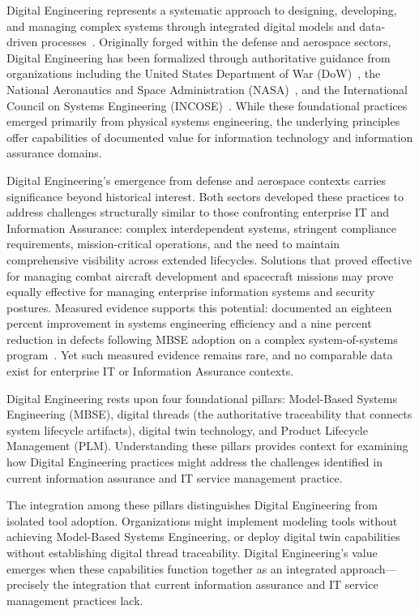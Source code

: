 Digital Engineering represents a systematic approach to designing, developing, and managing complex systems through integrated digital models and data-driven processes~\parencite{DigitalEngineeringInformationExchange}. Originally forged within the defense and aerospace sectors, Digital Engineering has been formalized through authoritative guidance from organizations including the United States Department of War (DoW)~\parencite{DoD_Engineering_2022}, the National Aeronautics and Space Administration (NASA)~\parencite{Engineer}, and the International Council on Systems Engineering (INCOSE)~\parencite{DigitalEngineeringInformationExchange}. While these foundational practices emerged primarily from physical systems engineering, the underlying principles offer capabilities of documented value for information technology and information assurance domains.

Digital Engineering's emergence from defense and aerospace contexts carries significance beyond historical interest. Both sectors developed these practices to address challenges structurally similar to those confronting enterprise IT and Information Assurance: complex interdependent systems, stringent compliance requirements, mission-critical operations, and the need to maintain comprehensive visibility across extended lifecycles. Solutions that proved effective for managing combat aircraft development and spacecraft missions may prove equally effective for managing enterprise information systems and security postures. Measured evidence supports this potential: \citeauthor{Rogers_Mitchell_2021} documented an eighteen percent improvement in systems engineering efficiency and a nine percent reduction in defects following MBSE adoption on a complex system-of-systems program~\parencite{Rogers_Mitchell_2021}. Yet such measured evidence remains rare, and no comparable data exist for enterprise IT or Information Assurance contexts.

Digital Engineering rests upon four foundational pillars: Model-Based Systems Engineering (MBSE), digital threads (the authoritative traceability that connects system lifecycle artifacts), digital twin technology, and Product Lifecycle Management (PLM). Understanding these pillars provides context for examining how Digital Engineering practices might address the challenges identified in current information assurance and IT service management practice.

The integration among these pillars distinguishes Digital Engineering from isolated tool adoption. Organizations might implement modeling tools without achieving Model-Based Systems Engineering, or deploy digital twin capabilities without establishing digital thread traceability. Digital Engineering's value emerges when these capabilities function together as an integrated approach---precisely the integration that current information assurance and IT service management practices lack.

